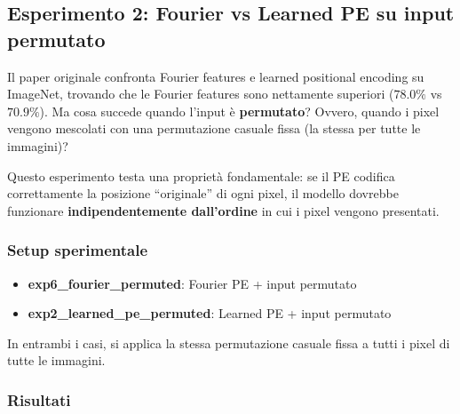 \documentclass[12pt,a4paper]{article}
\begin{document}
\subsection{Esperimento 2: Fourier vs Learned PE su input permutato} \label{sec:exp_fourier_vs_learned}

Il paper originale confronta Fourier features e learned positional encoding su ImageNet, trovando che le Fourier features sono nettamente superiori ($78.0\%$ vs $70.9\%$). Ma cosa succede quando l'input \`e \textbf{permutato}? Ovvero, quando i pixel vengono mescolati con una permutazione casuale fissa (la stessa per tutte le immagini)?

Questo esperimento testa una propriet\`a fondamentale: se il PE codifica correttamente la posizione ``originale'' di ogni pixel, il modello dovrebbe funzionare \textbf{indipendentemente dall'ordine} in cui i pixel vengono presentati.

\subsubsection{Setup sperimentale}

\begin{itemize}
    \item \textbf{exp6\_fourier\_permuted}: Fourier PE + input permutato
    \item \textbf{exp2\_learned\_pe\_permuted}: Learned PE + input permutato
\end{itemize}
In entrambi i casi, si applica la stessa permutazione casuale fissa a tutti i pixel di tutte le immagini.

\subsubsection{Risultati}

\begin{center}
\end{center}
\end{document}
